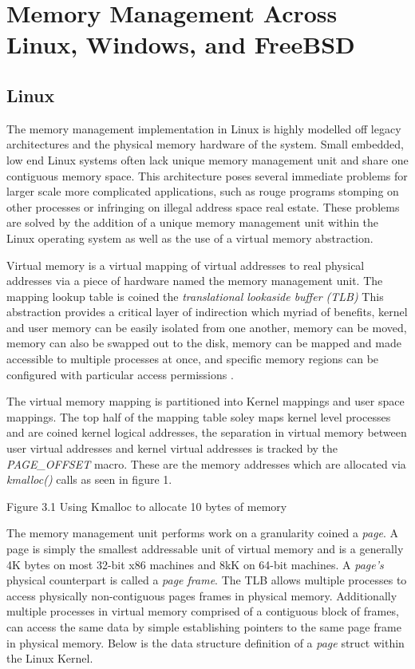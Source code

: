 \section{\bf Memory Management Across Linux, Windows, and FreeBSD}
\subsection{\bf Linux}
    \normalfont \indent The memory management implementation in Linux is highly modelled off legacy architectures and the physical memory hardware of the system. Small embedded, low end Linux systems often lack unique memory management unit and share one contiguous memory space\cite{Love_book}. This architecture poses several immediate problems for larger scale more complicated applications, such as rouge programs stomping on other processes or infringing on illegal address space real estate. These problems are solved by the addition of a unique memory management unit within the Linux operating system as well as the use of a virtual memory abstraction. 
	
	\normalfont \indent Virtual memory is a virtual mapping of virtual addresses to real physical addresses via a piece of hardware named the memory management unit. The mapping lookup table is coined the \textit{translational lookaside buffer (TLB)} This abstraction provides a critical layer of indirection which myriad of benefits, kernel and user memory can be easily isolated from one another, memory can be moved, memory can also be swapped out to the disk, memory can be mapped and made accessible to multiple processes at once, and specific memory regions can be configured with particular access permissions \cite{linux_documentation}.
	
	\normalfont \indent The virtual memory mapping is partitioned into Kernel mappings and user space mappings. The top half of the mapping table soley maps kernel level processes and are coined kernel logical addresses, the separation in virtual memory between user virtual addresses and kernel virtual addresses is tracked by the \textit{PAGE\_OFFSET} macro. These are the memory addresses which are allocated via \textit{kmalloc()} calls as seen in figure 1. 
	

\begin{center}
Figure 3.1 Using Kmalloc to allocate 10 bytes of memory 
\end{center}

      \normalfont \indent The memory management unit performs work on a granularity coined a \textit{page}. A page is simply the smallest addressable unit of virtual memory and is a generally 4K bytes on most 32-bit x86 machines and 8kK on 64-bit machines\cite{Love_book}. A \textit{page’s} physical counterpart is called a \textit{page frame}. The TLB allows multiple processes to access physically non-contiguous pages frames in physical memory. Additionally multiple processes in virtual memory comprised of a contiguous block of frames, can access the same data by simple establishing pointers to the same page frame in physical memory. Below is the data structure definition of a \textit{page} struct within the Linux Kernel.
	 
